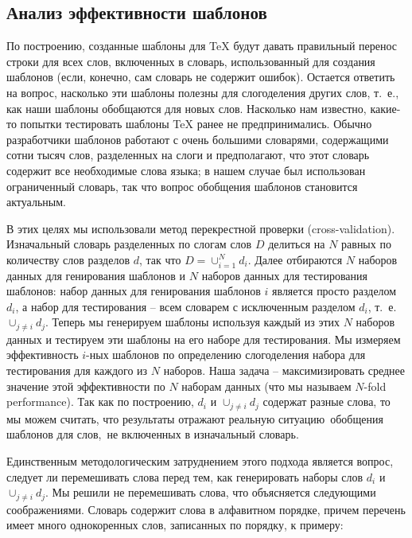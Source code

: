 \documentclass[12pt,a4paper,oneside]{extarticle}
\begin{document}
\subsection{Анализ эффективности шаблонов}

По построению, созданные шаблоны для \TeX{} будут давать правильный перенос строки для всех слов, включенных в словарь, использованный для создания шаблонов (если, конечно, сам словарь не содержит ошибок). Остается ответить на вопрос, насколько эти шаблоны полезны для слогоделения других слов, т.~е., как наши шаблоны обобщаются для новых слов. Насколько нам известно, какие-то попытки тестировать шаблоны \TeX{} ранее не предпринимались. Обычно разработчики шаблонов работают с очень большими словарями, содержащими сотни тысяч слов, разделенных на слоги и предполагают, что этот словарь содержит все необходимые слова языка; в нашем случае был использован ограниченный словарь, так что вопрос обобщения шаблонов становится актуальным.

В этих целях мы использовали метод перекрестной проверки (\textenglish{cross-validation}). Изначальный словарь разделенных по слогам слов $D$ делиться на $N$ равных по количеству слов разделов $d$, так что $D = \cup_{i = 1}^{N} d_i$. Далее отбираются $N$ наборов данных для генирования шаблонов и $N$ наборов данных для тестирования шаблонов: набор данных для генирования шаблонов $i$ является просто разделом $d_i$, а набор для тестирования -- всем словарем с исключенным разделом $d_i$, т.~е. $\cup_{j \neq i} d_j$. Теперь мы генерируем шаблоны используя каждый из этих $N$ наборов данных и тестируем эти шаблоны на его наборе для тестирования. Мы измеряем эффективность  $i$-ных шаблонов по определению слогоделения набора для тестирования для каждого из $N$ наборов. Наша задача -- максимизировать среднее значение этой эффективности по $N$ наборам данных (что мы называем \textenglish{$N$-fold performance}). Так как по построению, $d_i$ и $\cup_{j \neq i} d_j$ содержат разные слова, то мы можем считать, что результаты отражают реальную ситуацию обобщения шаблонов для слов, не включенных в изначальный словарь. 

Единственным методологическим затруднением этого подхода является вопрос, следует ли перемешивать слова перед тем, как генерировать наборы слов $d_i$ и $\cup_{j \neq i} d_j$. Мы решили не перемешивать слова, что объясняется следующими соображениями. Словарь содержит слова в алфавитном порядке, причем перечень имеет много однокоренных слов, записанных по порядку, к примеру:
\end{document}
